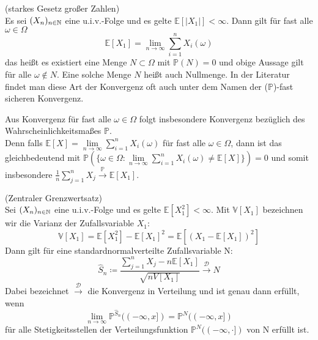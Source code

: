 \begin{Satz}(starkes Gesetz großer Zahlen)\\
	Es sei $ (X_n)_{n \in \mathbb{N}} $ eine u.i.v.-Folge und es gelte $ \mathbb{E}[|X_1|] < \infty$. Dann gilt für fast alle $ \omega  \in \Omega$ 
	\[
		\mathbb{E}[X_1] = \lim_{n \to \infty} \sum_{i=1}^n X_i(\omega)
	\]
	das heißt es existiert eine Menge $ N \subset \Omega $ mit $ \mathbb{P}(N)=0 $ und obige Aussage gilt für alle $ \omega \not \in N $. Eine solche Menge $ N $ heißt auch Nullmenge. In der Literatur findet man diese Art der Konvergenz oft auch unter dem Namen der ($\mathbb{P}$)-fast sicheren Konvergenz.
\end{Satz} 
\begin{Bemerkung}
	Aus Konvergenz für fast alle $ \omega \in \Omega $ folgt insbesondere Konvergenz bezüglich des Wahrscheinlichkeitsmaßes $ \mathbb{P} $.\\
	 Denn falls $ \mathbb{E}[X] = \lim\limits_{n \to \infty} \sum_{i=1}^n X_i(\omega) $ für fast alle $ \omega \in \Omega $, dann ist das gleichbedeutend mit $ \mathbb{P}(\{ \omega \in \Omega:  \lim\limits_{n \to \infty} \sum_{i=1}^n X_i(\omega) \not = \mathbb{E}[X] \}) = 0 $ und somit insbesondere $ \frac{1}{n} \sum_{j=1}^n X_j \stackrel{\mathbb{P}}{\to} \mathbb{E}[X_1] $.
\end{Bemerkung}
\begin{Satz}(Zentraler Grenzwertsatz)\\
	Sei $ (X_n)_{n \in \mathbb{N}} $ eine u.i.v.-Folge und es gelte $ \mathbb{E}[X_1^2] < \infty $.
	Mit $ \mathbb{V}[X_1] $ bezeichnen wir die Varianz der Zufallsvariable $ X_1 $:
	\[
		\mathbb{V}[X_1] = \mathbb{E}[X_1^2]-\mathbb{E}[X_1]^2 = \mathbb{E}[(X_1-\mathbb{E}[X_1])^2]
	\]
	Dann gilt für eine standardnormalverteilte Zufallsvariable N:
	\[
		\hat{S}_n \coloneqq\frac{\sum_{j=1}^{n}X_j-n\mathbb{E}[X_1]}{\sqrt{nV[X_1]}} \stackrel{\mathcal{D}}{\to} N
	\]
	Dabei bezeichnet $ \stackrel{\mathcal{D}}{\to} $ die Konvergenz in Verteilung und ist genau dann erfüllt, wenn 
	\[ \lim\limits_{n \to \infty} \mathbb{P}^{\hat{S}_n}((-\infty,x]) = \mathbb{P}^N((-\infty,x])
	\]
	für alle Stetigkeitsstellen der Verteilungsfunktion $ \mathbb{P}^N((-\infty,\cdot]) $ von N erfüllt ist.
\end{Satz}

